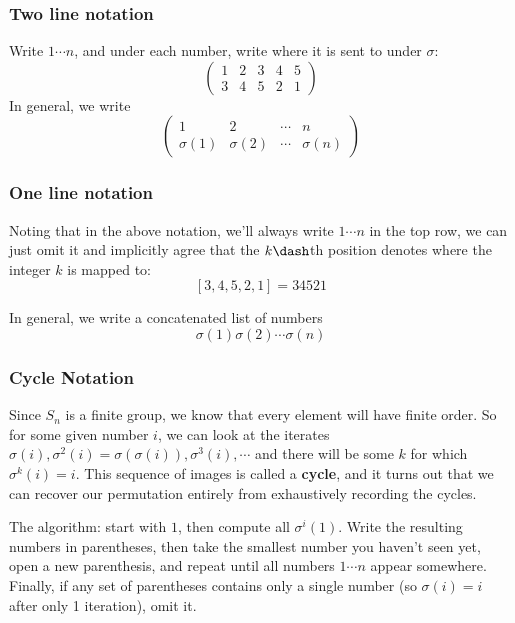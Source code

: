 \hypertarget{two-line-notation}{%
\subsubsection{Two line notation}\label{two-line-notation}}

Write \(1\cdots n\), and under each number, write where it is sent to
under \(\sigma\): \[
\left( \begin{array}{ccccc}
1 & 2 & 3 & 4 & 5 \\
3 & 4 & 5 & 2 & 1
\end{array}\right)
\] In general, we write \[
\left( \begin{array}{cccc}
1 & 2 & \cdots & n  \\
\sigma(1) & \sigma(2) & \cdots & \sigma(n)
\end{array}\right)
\]

\hypertarget{one-line-notation}{%
\subsubsection{One line notation}\label{one-line-notation}}

Noting that in the above notation, we'll always write \(1\cdots n\) in
the top row, we can just omit it and implicitly agree that the
\(k\dash\)th position denotes where the integer \(k\) is mapped to: \[
[3,4,5,2,1] = 34521
\]

In general, we write a concatenated list of numbers \[
\sigma(1)\sigma(2) \cdots \sigma(n)
\]

\hypertarget{cycle-notation}{%
\subsubsection{Cycle Notation}\label{cycle-notation}}

Since \(S_n\) is a finite group, we know that every element will have
finite order. So for some given number \(i\), we can look at the
iterates
\(\sigma(i), \sigma^2(i) = \sigma(\sigma(i)), \sigma^3(i), \cdots\) and
there will be some \(k\) for which \(\sigma^k(i) = i\). This sequence of
images is called a \textbf{cycle}, and it turns out that we can recover
our permutation entirely from exhaustively recording the cycles.

The algorithm: start with \(1\), then compute all \(\sigma^i(1)\). Write
the resulting numbers in parentheses, then take the smallest number you
haven't seen yet, open a new parenthesis, and repeat until all numbers
\(1 \cdots n\) appear somewhere. Finally, if any set of parentheses
contains only a single number (so \(\sigma(i) = i\) after only 1
iteration), omit it.

